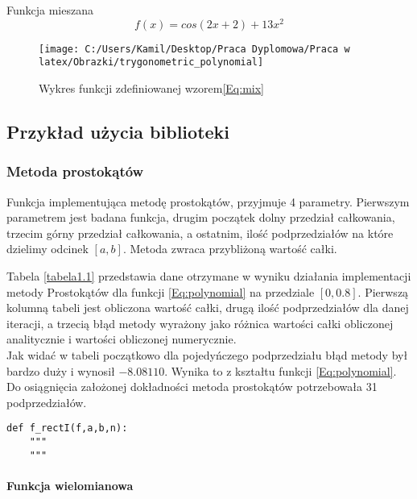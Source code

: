 \documentclass[12pt,twoside]{article}
\begin{document}
Funkcja mieszana
\begin{equation}
f(x) = cos(2x+2) + 13x^2
\label{Eq:mix}
\end{equation}

\begin{figure}
\texttt{[image: C:/Users/Kamil/Desktop/Praca Dyplomowa/Praca w latex/Obrazki/trygonometric\_polynomial]}
\caption{Wykres funkcji zdefiniowanej wzorem\eqref{Eq:mix}}
\end{figure}

\subsection{Przykład użycia biblioteki}

\subsubsection{Metoda prostokątów}
	Funkcja implementująca metodę prostokątów, przyjmuje 4 parametry. Pierwszym parametrem jest badana funkcja, drugim początek dolny przedział całkowania, trzecim górny przedział całkowania, a ostatnim, ilość podprzedziałów na które dzielimy odcinek $[a,b]$. Metoda zwraca przybliżoną wartość całki.
	
	Tabela \eqref{tabela1.1} przedstawia dane otrzymane w wyniku działania implementacji metody Prostokątów dla funkcji \eqref{Eq:polynomial} na przedziale $[0,0.8]$.
	Pierwszą kolumną tabeli jest obliczona wartość całki, drugą ilość podprzedziałów dla danej iteracji, a trzecią błąd metody wyrażony jako różnica wartości całki obliczonej 			analitycznie i wartości obliczonej numerycznie.\\
	Jak widać w tabeli początkowo dla pojedyńczego podprzedziału błąd metody był bardzo duży i wynosił $-8.08110$. Wynika to z kształtu funkcji \eqref{Eq:polynomial}.\\
	Do osiągnięcia założonej dokładności metoda prostokątów potrzebowała 31 podprzedziałów.
	
\begin{lstlisting}[caption={Kod w języku python implementujący metodę prostokątów}]
def f_rectI(f,a,b,n):
    """
    """
\end{lstlisting}
\label{Listing 6}


\paragraph{Funkcja wielomianowa}\mbox{} \\
\end{document}
